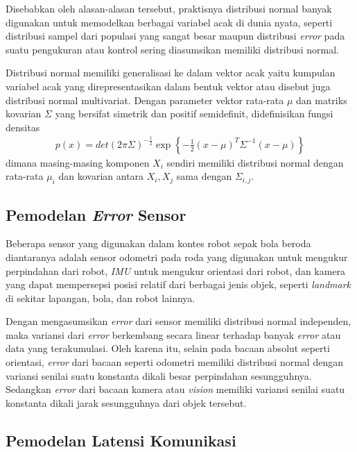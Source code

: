 Disebabkan oleh alasan-alasan tersebut, praktisnya distribusi normal banyak digunakan untuk memodelkan berbagai variabel acak di dunia nyata, seperti distribusi sampel dari populasi yang sangat besar maupun distribusi \textit{error} pada suatu pengukuran atau kontrol sering diasumsikan memiliki distribusi normal.

Distribusi normal memiliki generalisasi ke dalam vektor acak yaitu kumpulan variabel acak yang direpresentasikan dalam bentuk vektor atau disebut juga distribusi normal multivariat. Dengan parameter vektor rata-rata $\mu$ dan matriks kovarian $\Sigma$ yang bersifat simetrik dan positif semidefinit, didefinisikan fungsi densitas
\begin{align}
    p(x) = det(2 \pi \Sigma)^{-\frac{1}{2}} \exp\left\{-\frac{1}{2}(x-\mu)^T \Sigma^{-1} (x-\mu)\right\}
\end{align}
dimana masing-masing komponen $X_i$ sendiri memiliki distribusi normal dengan rata-rata $\mu_i$ dan kovarian antara $X_i, X_j$ sama dengan $\Sigma_{i,j}$.

\subsection{Pemodelan \textit{Error} Sensor}

Beberapa sensor yang digunakan dalam kontes robot sepak bola beroda diantaranya adalah sensor odometri pada roda yang digunakan untuk mengukur perpindahan dari robot, \textit{IMU} untuk mengukur orientasi dari robot, dan kamera yang dapat mempersepsi posisi relatif dari berbagai jenis objek, seperti \textit{landmark} di sekitar lapangan, bola, dan robot lainnya.

Dengan mengasumsikan \textit{error} dari sensor memiliki distribusi normal independen, maka variansi dari \textit{error} berkembang secara linear terhadap banyak \textit{error} atau data yang terakumulasi. Oleh karena itu, selain pada bacaan absolut seperti orientasi, \textit{error} dari bacaan seperti odometri memiliki distribusi normal dengan variansi senilai suatu konstanta dikali besar perpindahan sesungguhnya. Sedangkan \textit{error} dari bacaan kamera atau \textit{vision} memiliki variansi senilai suatu konstanta dikali jarak sesungguhnya dari objek tersebut.

\subsection{Pemodelan Latensi Komunikasi}

